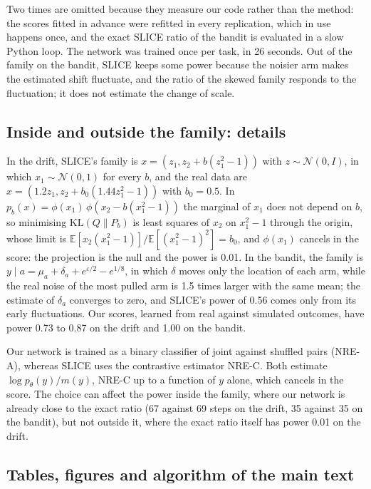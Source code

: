 \documentclass[11pt]{article}
\newcommand{\E}{\mathbb{E}}
\newcommand{\KL}{\mathrm{KL}}
\theoremstyle{remark}
\begin{document}
Two times are omitted because they measure our code rather than the method:
the scores fitted in advance were refitted in every replication, which in use
happens once, and the exact SLICE ratio of the bandit is evaluated in a slow
Python loop. The network was trained once per task, in 26 seconds. Out of the
family on the bandit, SLICE keeps some power because the noisier arm makes the
estimated shift fluctuate, and the ratio of the skewed family responds to the
fluctuation; it does not estimate the change of scale.

\subsection{Inside and outside the family: details}

In the drift, SLICE's family is $x = (z_1, z_2 + b(z_1^2 - 1))$ with
$z \sim \mathcal N(0, I)$, in which $x_1 \sim \mathcal N(0, 1)$ for every $b$,
and the real data are $x = (1.2 z_1, z_2 + b_0(1.44 z_1^2 - 1))$ with
$b_0 = 0.5$. In $p_b(x) = \phi(x_1)\,\phi(x_2 - b(x_1^2 - 1))$ the marginal of
$x_1$ does not depend on $b$, so minimising $\KL(Q\|P_b)$ is least squares of
$x_2$ on $x_1^2 - 1$ through the origin, whose limit is
$\E[x_2(x_1^2 - 1)]/\E[(x_1^2 - 1)^2] = b_0$, and $\phi(x_1)$ cancels in the
score: the projection is the null and the power is 0.01. In the bandit, the
family is $y \mid a = \mu_a + \delta_a + e^{\varepsilon/2} - e^{1/8}$, in which
$\delta$ moves only the location of each arm, while the real noise of the most
pulled arm is 1.5 times larger with the same mean; the estimate of $\delta_a$
converges to zero, and SLICE's power of 0.56 comes only from its early
fluctuations. Our scores, learned from real against simulated outcomes, have
power 0.73 to 0.87 on the drift and 1.00 on the bandit.

Our network is trained as a binary classifier of joint against shuffled pairs
(NRE-A), whereas SLICE uses the contrastive estimator NRE-C. Both estimate
$\log p_\theta(y)/m(y)$, NRE-C up to a function of $y$ alone, which cancels in
the score. The choice can affect the power inside the family, where our network
is already close to the exact ratio (67 against 69 steps on the drift, 35
against 35 on the bandit), but not outside it, where the exact ratio itself has
power 0.01 on the drift.

\subsection{Tables, figures and algorithm of the main text}\label{sec:moved}
\end{document}
